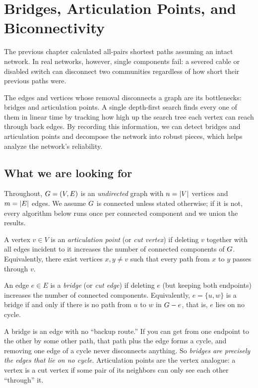 \chapter{Bridges, Articulation Points, and Biconnectivity}

The previous chapter calculated all-pairs shortest paths assuming an intact network.
In real networks, however, single components fail: a severed cable or disabled switch
can disconnect two communities regardless of how short their previous paths were.

The edges and vertices whose removal disconnects a graph are its bottlenecks: bridges
and articulation points. A single depth-first search finds every one of them in linear time
by tracking how high up the search tree each vertex can reach through back edges. By recording this
information, we can detect bridges and articulation points and decompose the network into robust
pieces, which helps analyze the network's reliability.

\chapterline

\section{What we are looking for}
\label{ch10:setup}

Throughout, $G=(V,E)$ is an \emph{undirected} graph with $n=\lvert V\rvert$ vertices and
$m=\lvert E\rvert$ edges. We assume $G$ is connected unless stated otherwise; if it is
not, every algorithm below runs once per connected component and we union the
results.

\begin{definition}
\label{ch10:def-artic}
A vertex $v\in V$ is an \emph{articulation point} (or \emph{cut vertex}) if deleting
$v$ together with all edges incident to it increases the number of connected
components of $G$. Equivalently, there exist vertices $x,y\neq v$ such that every
path from $x$ to $y$ passes through $v$.
\end{definition}

\begin{definition}[Bridge]
\label{ch10:def-bridge}
An edge $e\in E$ is a \emph{bridge} (or \emph{cut edge}) if deleting $e$ (but keeping
both endpoints) increases the number of connected components. Equivalently, $e=\{u,w\}$
is a bridge if and only if there is no path from $u$ to $w$ in $G-e$, that is, $e$ lies on no
cycle.
\end{definition}

\begin{intuitionbox}
A bridge is an edge with no ``backup route.'' If you can get from one endpoint to the
other by some other path, that path plus the edge forms a cycle, and removing one
edge of a cycle never disconnects anything. So \emph{bridges are precisely the edges
that lie on no cycle}. Articulation points are the vertex analogue: a vertex is a cut
vertex if some pair of its neighbors can only see each other ``through'' it.
\end{intuitionbox}

